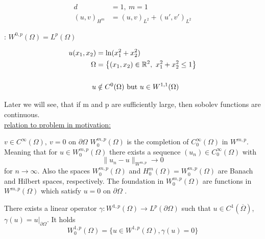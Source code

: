 \begin{example}
	\begin{align*}
		d&=1,\ m=1\\
		(u,v)_{H^m} &= (u,v)_{L^2} + (u',v')_{L^2}
	\end{align*} 
\end{example}

 
\begin{remark}: $W^{0,p}(\Omega) = L^p(\Omega)$\\
\end{remark}

\begin{example}
	\begin{align*}
	u(x_1,x_2) &= \text{ln}(x^2_1 + x^2_2)\\
	\Omega &= \big \{  (x_1,x_2)\in\mathbb{R}^2,\ x^2_1 + x^2_2 \leq 1    \big \} \\
	& \\
	u &\notin C^0(\Omega) \text{ but } u \in W^{1,1}(\Omega)
	\end{align*}
\end{example}
 
Later we will see, that if m and p are sufficiently large, then sobolev functions are continuous.\\
 
\underline{relation to problem in motivation:}\\

%
%
%
%
%

\par
\glqq $v \in C^\infty(\Omega),\ v=0 \text{ on } \partial\Omega$ \grqq \enter
$W^{m,p}_0(\Omega)$ is the completion of $C^\infty_0(\Omega)$ in $ W^{m,p} $. Meaning that for $u \in W^{m,p}_0(\Omega)$ there exists a sequence $(u_n) \in C^\infty_0(\Omega)$ with 
\begin{equation*}
	\|u_n - u\|_{W^{m,p}} \to 0
\end{equation*}
for $n \to \infty$.\enter
Also the spaces $W^{m,p}_0(\Omega)$ and $H^m_0(\Omega) = W^{m,p}_0(\Omega)$ are Banach and Hilbert spaces, respectively. The foundation in $W^{m,p}_0(\Omega)$ are functions in $W^{m,p}(\Omega)$ which satisfy \glqq $u =0$ on $\partial \Omega$ \grqq. \enter 
\par

There exists a linear operator $\gamma: W^{1,p}(\Omega) \to L^p(\partial\Omega)$ such that $u \in C^1(\overline{\Omega})$, $\gamma(u) = u|_{\partial \Omega}$. It holds 
\begin{equation*}
	W^{1,p}_0(\Omega) = \big \{ u \in W^{1,p}(\Omega), \gamma(u) = 0 \big \}
\end{equation*}

